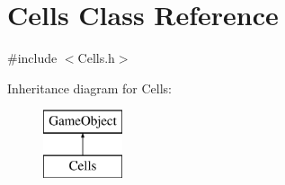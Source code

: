 \hypertarget{class_cells}{}\section{Cells Class Reference}
\label{class_cells}


{\ttfamily \#include $<$Cells.\+h$>$}

Inheritance diagram for Cells\+:\begin{figure}[H]
\begin{center}
\leavevmode
\includegraphics[height=2.000000cm]{class_cells}
\end{center}
\end{figure}
